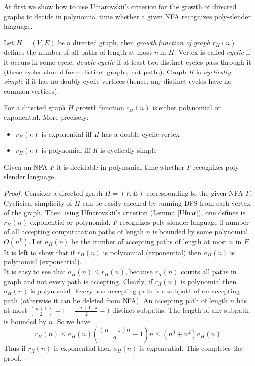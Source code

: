 At first we show how to use Ufnarovskii's criterion for the growth of directed graphs \cite{Ufnarovskii} to decide in polynomial time whether a given NFA recognizes poly-slender language. 


Let $H = (V,  E)$ be a directed graph, then \textit{growth function of graph} $r_H(n)$ defines the number of all paths of length at most $n$ in $H$. Vertex is called \textit{cyclic} if it occurs in some cycle, \textit{double cyclic} if at least two distinct cycles pass through it (these cycles should form distinct graphs, not paths). Graph $H$ is \textit{cyclically simple} if it has no doubly cyclic vertices (hence, any distinct cycles have no common vertices).
\begin{lemma}
\label{Ufnar}
For a directed graph $H$ growth function $r_H(n)$ is either polynomial or exponential. More precisely:
\begin{itemize}
\item $r_H(n)$ is exponential iff $H$ has a double cyclic vertex
\item $r_H(n)$ is polynomial iff $H$ is cyclically simple
\end{itemize}
\end{lemma}
\begin{theorem}
\label{lemconstr}
Given an NFA $F$ it is decidable in polynomial time whether $F$ recognizes poly-slender language.
\end{theorem}
\begin{proof}
Consider a directed graph $H = (V, E)$ corresponding to the given NFA $F$. Cyclicical simplicity of $H$ can be easily checked by running DFS from each vertex of the graph. Then using Ufnarovskii's criterion (Lemma \ref{Ufnar}), one defines is $r_H(n)$ exponential or polynomial. $F$ recognizes poly-slender language if number of all accepting computatation paths of length $n$ is bounded by some polynomial $O(n^k)$. Let $a_H(n)$ be the number of accepting paths of length at most $n$ in $F$. It is left to show that if $r_H(n)$ is polynomial (exponential) then $a_H(n)$ is polynomial (exponential).
\\
It is easy to see that $a_H(n) \le r_H(n)$, because $r_H(n)$ counts all paths in graph and not every path is accepting. Clearly, if $r_H(n)$ is polynomial then $a_H(n)$ is polynomial. 
Every non-accepting path is a subpath of an accepting path (otherwise it can be deleted from NFA). An accepting path of length $n$ has at most $\binom{n+1}{2} -1 = \frac{(n+1)n}{2} -1$ distinct subpaths. The length of any subpath is bounded by $n$. So we have
$$
r_H(n) \le a_H(n) (\frac{(n+1)n}{2} -1) n \le (n^3 + n^2) a_H(n)
$$
Thus if $r_H(n)$ is exponential then $a_H(n)$ is exponential. This completes the proof.
\end{proof}

